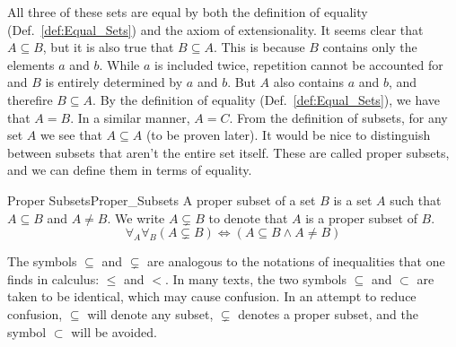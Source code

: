         \par\vspace{2.5ex}
        All three of these sets are equal by both the definition of equality
        (Def.~\ref{def:Equal_Sets}) and the axiom of
        extensionality. It seems clear that
        $A\subseteq{B}$, but it is also true that $B\subseteq{A}$. This is
        because $B$ contains only the elements $a$ and $b$. While $a$ is
        included twice, repetition cannot be accounted for and $B$ is entirely
        determined by $a$ and $b$. But $A$ also contains $a$ and $b$, and
        therefire $B\subseteq{A}$. By the definition of equality
        (Def.~\ref{def:Equal_Sets}), we have that $A=B$. In a similar manner,
        $A=C$. From the definition of subsets, for any set $A$ we see that
        $A\subseteq{A}$ (to be proven later). It would be nice to distinguish
        between subsets that aren't the entire set itself. These are called
        proper subsets, and we can define them in terms of
        equality.
        \begin{fdefinition}{Proper Subsets}{Proper_Subsets}
            A \gls{proper subset} of a \gls{set} $B$ is a set $A$ such that
            $A\subseteq{B}$ and $A\ne{B}$. We write $A\subsetneq{B}$
            to denote that $A$ is a proper subset of $B$.
            \begin{equation*}
                \forall_{A}\forall_{B}(A\subsetneq{B})
                \Leftrightarrow(A\subseteq{B}\land{A}\ne{B})
            \end{equation*}
        \end{fdefinition}
        The symbols $\subseteq$ and $\subsetneq$ are analogous to the notations
        of inequalities that one finds in calculus: $\leq$ and $<$. In many
        texts, the two symbols $\subseteq$ and $\subset$ are taken to be
        identical, which may cause confusion. In an attempt to reduce confusion,
        $\subseteq$ will denote any subset, $\subsetneq$ denotes a proper
        subset, and the symbol $\subset$ will be avoided.
